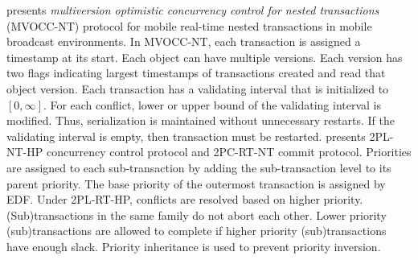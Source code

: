 \documentclass[10pt, conference, compsocconf]{IEEEtran}
\begin{document}
\cite{4709120} presents \textit{multiversion optimistic concurrency control for nested transactions} (MVOCC-NT) protocol for mobile real-time nested transactions in mobile broadcast environments. In MVOCC-NT, each transaction is assigned a timestamp at its start. Each object can have multiple versions. Each version has two flags indicating largest timestamps of transactions created and read that object version. 
Each transaction has a validating interval that is initialized to $[0,\infty]$. For each conflict, lower or upper bound of the validating interval is modified. Thus, serialization is maintained without unnecessary restarts. If the validating interval is empty, then transaction must be restarted. 
%
\cite{1420972} presents 2PL-NT-HP concurrency control protocol and 2PC-RT-NT commit protocol. %
Priorities are assigned to each sub-transaction by adding the sub-transaction level to its parent priority. The base priority of the outermost transaction is assigned by EDF. Under 2PL-RT-HP, conflicts are resolved based on higher priority. (Sub)transactions in the same family do not abort each other. Lower priority (sub)transactions are allowed to complete if higher priority (sub)transactions have enough slack. Priority inheritance is used to prevent priority inversion. 
\end{document}
